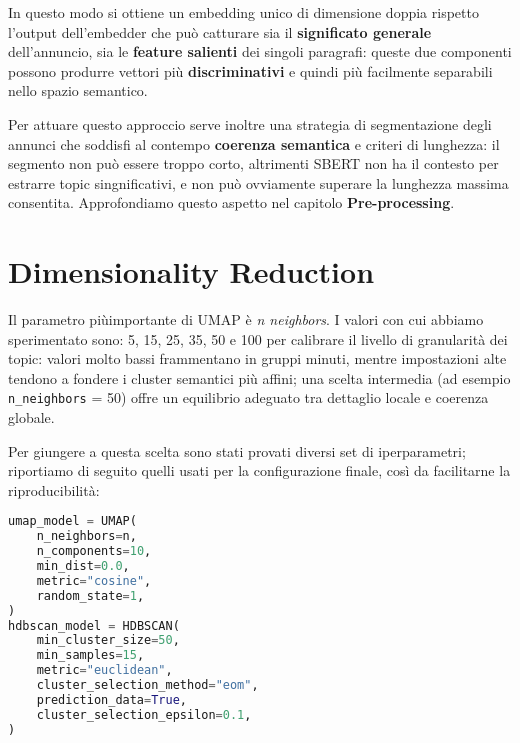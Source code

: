 In questo modo si ottiene un embedding unico di dimensione doppia rispetto l'output dell'embedder che può catturare sia il \textbf{significato generale} dell'annuncio, sia le \textbf{feature salienti} dei singoli paragrafi: queste due componenti possono produrre vettori più \textbf{discriminativi} e quindi più facilmente separabili nello spazio semantico.

Per attuare questo approccio serve inoltre una strategia di segmentazione degli annunci che soddisfi al contempo \textbf{coerenza semantica} e criteri di lunghezza: il segmento non può essere troppo corto, altrimenti SBERT non ha il contesto per estrarre topic singnificativi, e non può ovviamente superare la lunghezza massima consentita. Approfondiamo questo aspetto nel capitolo \textbf{Pre-processing}.

\section{Dimensionality Reduction}
\noindent Il parametro piùimportante di UMAP è \emph{n neighbors}. I valori con cui abbiamo sperimentato sono: 5, 15, 25, 35, 50 e 100 per calibrare il livello di granularità dei topic: valori molto bassi frammentano in gruppi minuti, mentre impostazioni alte tendono a fondere i cluster semantici più affini; una scelta intermedia (ad esempio \texttt{n\_neighbors} = 50) offre un equilibrio adeguato tra dettaglio locale e coerenza globale.

Per giungere a questa scelta sono stati provati diversi set di iperparametri; riportiamo di seguito quelli usati per la configurazione finale, così da facilitarne la riproducibilità:

\begin{lstlisting}[language=Python]
umap_model = UMAP(
    n_neighbors=n,
    n_components=10,
    min_dist=0.0,
    metric="cosine",
    random_state=1,
)
hdbscan_model = HDBSCAN(
    min_cluster_size=50,
    min_samples=15,
    metric="euclidean",
    cluster_selection_method="eom",
    prediction_data=True,
    cluster_selection_epsilon=0.1,
)
\end{lstlisting}

